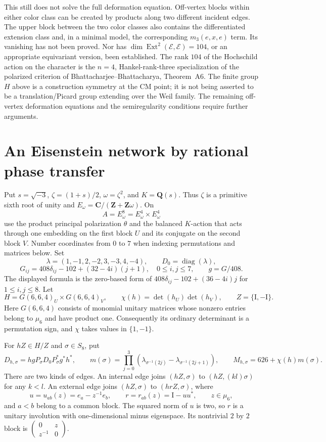 \documentclass[11pt]{article}
\theoremstyle{definition}
\theoremstyle{remark}
\newcommand{\Q}{\mathbf Q}
\newcommand{\Z}{\mathbf Z}
\newcommand{\C}{\mathbf C}
\newcommand{\Id}{\mathrm I}
\begin{document}
This still does not solve the full deformation equation.  Off-vertex blocks within either color class can be created by
products along two different incident edges.  The upper block
between the two color classes also contains the differentiated
extension class and, in a minimal model, the corresponding
\(m_3(e,x,e)\) term.  Its vanishing has not been proved.  Nor has
\(\dim\operatorname{Ext}^2(\mathcal E,\mathcal E)=104\), or an
appropriate equivariant version, been established.  The rank
\(104\) of the Hochschild action on the character is the
\(n=4\), Hankel-rank-three specialization of the polarized
criterion of Bhattacharjee--Bhattacharya, Theorem~A6.  The finite
group \(H\) above is a construction symmetry at the CM point;
it is not being asserted to be a translation/Picard group extending
over the Weil family.  The remaining off-vertex deformation equations
and the semiregularity conditions require further arguments.
\section{An Eisenstein network by rational phase transfer}\label{sec:eisenstein-trace-network}

Put $s=\sqrt{-3}$, $\zeta=(1+s)/2$, $\omega=\zeta^2$, and
$K=\Q(s)$.  Thus $\zeta$ is a primitive sixth root of unity and
$E_\omega=\C/(\Z+\Z\omega)$.  On
\[
 A=E_\omega^8=E_\omega^4\times E_\omega^4
\]
use the product principal polarization $\theta$ and the balanced $K$-action
that acts through one embedding on the first block $U$ and its conjugate
on the second block $V$.  Number coordinates from $0$ to $7$ when indexing
permutations and matrices below.  Set
\[
 \lambda=(1,-1,2,-2,3,-3,4,-4),\qquad
 D_0=\operatorname{diag}(\lambda),
\]
\[
 G_{ij}=408\delta_{ij}-102+(32-4i)(j+1),\quad 0\leq i,j\leq7,
 \qquad g=G/408.
\]
The displayed formula is the zero-based form of
$408\delta_{ij}-102+(36-4i)j$ for $1\leq i,j\leq8$.
Let
\[
 H=G(6,6,4)_U\times G(6,6,4)_V,\qquad
 \chi(h)=\det(h_U)\det(h_V),\qquad Z=\{\Id,-\Id\}.
\]
Here $G(6,6,4)$ consists of monomial unitary matrices whose nonzero
entries belong to $\mu_6$ and have product one.  Consequently its
ordinary determinant is a permutation sign, and $\chi$ takes values
in $\{1,-1\}$.

For $hZ\in H/Z$ and $\sigma\in S_8$, put
\[
 D_{h,\sigma}=hgP_\sigma D_0P_\sigma^*g^*h^*,\qquad
 m(\sigma)=\prod_{j=0}^3
    (\lambda_{\sigma^{-1}(2j)}-\lambda_{\sigma^{-1}(2j+1)}),
 \qquad M_{h,\sigma}=626+\chi(h)m(\sigma).
\]
There are two kinds of edges.  An internal edge joins
$(hZ,\sigma)$ to $(hZ,(kl)\sigma)$ for any $k<l$.  An external edge
joins $(hZ,\sigma)$ to $(hrZ,\sigma)$, where
\begin{equation}\label{eisenstein-trace-eq:root}
 u=u_{ab}(z)=e_a-z^{-1}e_b,\qquad
 r=r_{ab}(z)=\Id-uu^*,\qquad z\in\mu_6,
\end{equation}
and $a<b$ belong to a common block.  The squared norm of $u$ is two,
so $r$ is a unitary involution with one-dimensional minus eigenspace.
Its nontrivial $2$ by $2$ block is
$\left(\begin{smallmatrix}0&z\\z^{-1}&0\end{smallmatrix}\right)$.
\end{document}
